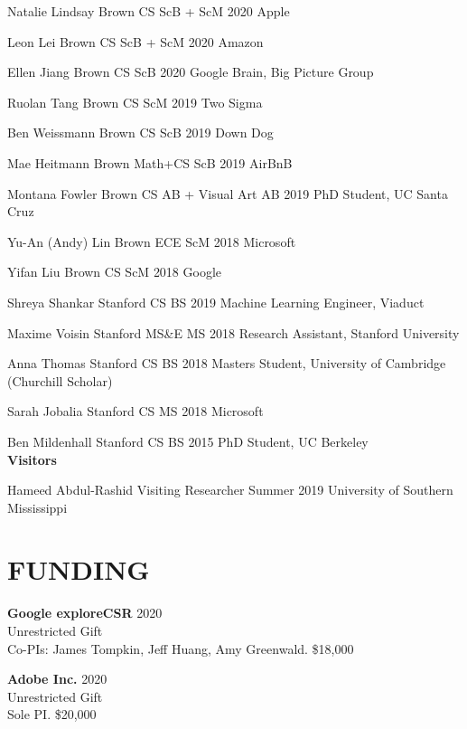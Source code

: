 \documentclass[line,margin]{res}
\begin{document}
\begin{resume}
\alumni
{Natalie Lindsay}
{Brown CS ScB + ScM}
{2020}
{Apple}

\alumni
{Leon Lei}
{Brown CS ScB + ScM}
{2020}
{Amazon}

\alumni
{Ellen Jiang}
{Brown CS ScB}
{2020}
{Google Brain, Big Picture Group}


\alumni
{Ruolan Tang}
{Brown CS ScM}
{2019}
{Two Sigma}

\alumni
{Ben Weissmann}
{Brown CS ScB}
{2019}
{Down Dog}

\alumni
{Mae Heitmann}
{Brown Math+CS ScB}
{2019}
{AirBnB}

\alumni
{Montana Fowler}
{Brown CS AB + Visual Art AB}
{2019}
{PhD Student, UC Santa Cruz}

\alumni
{Yu-An (Andy) Lin}
{Brown ECE ScM}
{2018}
{Microsoft}

\alumni
{Yifan Liu}
{Brown CS ScM}
{2018}
{Google}

\alumni
{Shreya Shankar}
{Stanford CS BS}
{2019}
{Machine Learning Engineer, Viaduct}

\alumni
{Maxime Voisin}
{Stanford MS\&E MS}
{2018}
{Research Assistant, Stanford University}

\alumni
{Anna Thomas}
{Stanford CS BS}
{2018}
{Masters Student, University of Cambridge (Churchill Scholar)}

\alumni
{Sarah Jobalia}
{Stanford CS MS}
{2018}
{Microsoft}

\alumni
{Ben Mildenhall}
{Stanford CS BS}
{2015}
{PhD Student, UC Berkeley}
\\


\textbf{Visitors}

\visitor
{Hameed Abdul-Rashid}
{Visiting Researcher}
{Summer 2019}
{University of Southern Mississippi}


\section{FUNDING}

\newcommand{\funding}[5] {
	\textbf{#1} \hfill #5\\
	#2 \\
	#3. #4
}

\funding
{Google exploreCSR}
{Unrestricted Gift}
{Co-PIs: James Tompkin, Jeff Huang, Amy Greenwald}
{\$18,000}
{2020}

\funding
{Adobe Inc.}
{Unrestricted Gift}
{Sole PI}
{\$20,000}
{2020}


\end{resume}
\end{document}
